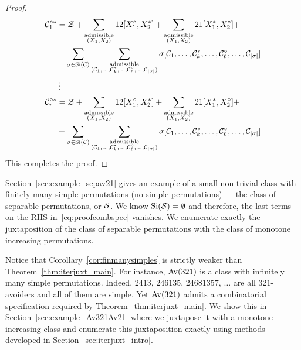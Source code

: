 \documentclass[12pt, a4paper, twoside]{report}
\begin{document}
\begin{proof}
  \begin{align}
    \begin{aligned}
    \C_1^{\circ*} &= \Z + \sum_{\substack{\text{admissible}\\(X_1,X_2)}}12[X_1^\circ,X_2^*] + \sum_{\substack{\text{admissible}\\(X_1,X_2)}}21[X_1^*,X_2^\circ] +\\
                   &+ \sum_{\sigma \in \Si(\C)}\sum_{\substack{\text{admissible}\\(\C_1,\ldots,\Cstar_k,\ldots,\C_\ell^\circ,\ldots,\C_{|\sigma|})}}\sigma[\C_1,\ldots,\Cstar_k,\ldots,\C_\ell^\circ,\ldots,\C_{|\sigma|}]\\
                   &\vdots\\
    \C_r^{\circ*} &= \Z + \sum_{\substack{\text{admissible}\\(X_1,X_2)}}12[X_1^\circ,X_2^*] + \sum_{\substack{\text{admissible}\\(X_1,X_2)}}21[X_1^*,X_2^\circ] +\\
                  &+ \sum_{\sigma \in \Si(\C)}\sum_{\substack{\text{admissible}\\(\C_1,\ldots,\Cstar_k,\ldots,\C_\ell^\circ,\ldots,\C_{|\sigma|})}}\sigma[\C_1,\ldots,\Cstar_k,\ldots,\C_\ell^\circ,\ldots,\C_{|\sigma|}]\\
                \end{aligned}
    \label{eq:proofcombspec}
  \end{align}
This completes the proof.
\end{proof}

Section~\ref{sec:example_sepav21} gives an example of a small non-trivial class with finitely many simple permutations (no simple permutations) --- the class of separable permutations, or $\S$. We know $\Si(\S) = \emptyset$ and therefore, the last terms on the RHS in~\eqref{eq:proofcombspec} vanishes. We enumerate exactly the juxtaposition of the class of separable permutations with the class of monotone increasing permutations. 

Notice that Corollary~\ref{cor:finmanysimples} is strictly weaker than Theorem~\ref{thm:iterjuxt_main}. For instance, $\Av(321)$ is a class with infinitely many simple permutations. Indeed, $2413$, $246135$, $24681357$, $\ldots$ are all $321$-avoiders and all of them are simple. Yet $\Av(321)$ admits a combinatorial specification required by Theorem~\ref{thm:iterjuxt_main}. We show this in Section~\ref{sec:example_Av321Av21} where we juxtapose it with a monotone increasing class and enumerate this juxtaposition exactly using methods developed in Section~\ref{sec:iterjuxt_intro}.
\end{document}
